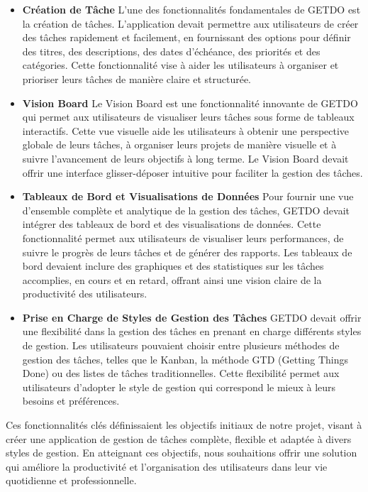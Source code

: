 \documentclass[a4paper,12pt]{report}
\begin{document}
    \begin{itemize}
    
    \item \textbf{Création de Tâche}
    L'une des fonctionnalités fondamentales de GETDO est la création de tâches. L'application devait permettre aux utilisateurs de créer des tâches rapidement et facilement, en fournissant des options pour définir des titres, des descriptions, des dates d'échéance, des priorités et des catégories. Cette fonctionnalité vise à aider les utilisateurs à organiser et prioriser leurs tâches de manière claire et structurée.

    \item \textbf{Vision Board}
    Le Vision Board est une fonctionnalité innovante de GETDO qui permet aux utilisateurs de visualiser leurs tâches sous forme de tableaux interactifs. Cette vue visuelle aide les utilisateurs à obtenir une perspective globale de leurs tâches, à organiser leurs projets de manière visuelle et à suivre l'avancement de leurs objectifs à long terme. Le Vision Board devait offrir une interface glisser-déposer intuitive pour faciliter la gestion des tâches.

    \item \textbf{Tableaux de Bord et Visualisations de Données}
    Pour fournir une vue d'ensemble complète et analytique de la gestion des tâches, GETDO devait intégrer des tableaux de bord et des visualisations de données. Cette fonctionnalité permet aux utilisateurs de visualiser leurs performances, de suivre le progrès de leurs tâches et de générer des rapports. Les tableaux de bord devaient inclure des graphiques et des statistiques sur les tâches accomplies, en cours et en retard, offrant ainsi une vision claire de la productivité des utilisateurs.

    \item \textbf{Prise en Charge de Styles de Gestion des Tâches}
    GETDO devait offrir une flexibilité dans la gestion des tâches en prenant en charge différents styles de gestion. Les utilisateurs pouvaient choisir entre plusieurs méthodes de gestion des tâches, telles que le Kanban, la méthode GTD (Getting Things Done) ou des listes de tâches traditionnelles. Cette flexibilité permet aux utilisateurs d'adopter le style de gestion qui correspond le mieux à leurs besoins et préférences.
    
    \end{itemize}

  
Ces fonctionnalités clés définissaient les objectifs initiaux de notre projet, visant à créer une application de gestion de tâches complète, flexible et adaptée à divers styles de gestion. En atteignant ces objectifs, nous souhaitions offrir une solution qui améliore la productivité et l'organisation des utilisateurs dans leur vie quotidienne et professionnelle.
\end{document}
